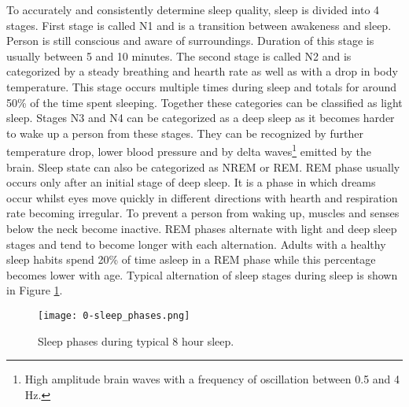 To accurately and consistently determine sleep quality, sleep is divided into 4 stages. First stage is called N1 and is a transition between awakeness and sleep. Person is still conscious and aware of surroundings. Duration of this stage is usually between 5 and 10 minutes. The second stage is called N2 and is categorized by a steady breathing and hearth rate as well as with a drop in body temperature. This stage occurs multiple times during sleep and totals for around 50\% of the time spent sleeping. Together these categories can be classified as light sleep. Stages N3 and N4 can be categorized as a deep sleep as it becomes harder to wake up a person from these stages. They can be recognized by further temperature drop, lower blood pressure and by delta waves\footnote{High amplitude brain waves with a frequency of oscillation between 0.5 and 4 Hz.} emitted by the brain. Sleep state can also be categorized as \ac{NREM} or \ac{REM}. REM phase usually occurs only after an initial stage of deep sleep. It is a phase in which dreams occur whilst eyes move quickly in different directions with hearth and respiration rate becoming irregular. To prevent a person from waking up, muscles and senses below the neck become inactive. \ac{REM} phases alternate with light and deep sleep stages and tend to become longer with each alternation. Adults with a healthy sleep habits spend 20\% of time asleep in a \ac{REM} phase while this percentage becomes lower with age. Typical alternation of sleep stages during sleep is shown in Figure \ref{fig:sleep-phases}. \\

\begin{figure}[h]
  \begin{center}
    \texttt{[image: 0-sleep\_phases.png]}
  \end{center}
  \caption{Sleep phases during typical 8 hour sleep.}
  \label{fig:sleep-phases}
\end{figure}

